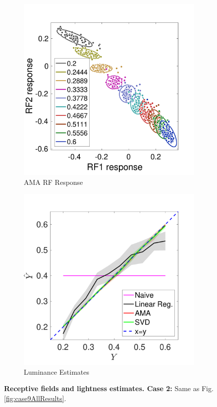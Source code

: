 \documentclass{jov}
\begin{document}
\begin{figure}
\begin{subfigure}[b]{0.20 \textwidth}
        \includegraphics[width=\textwidth]{Figure6/case10FiltersResponse.pdf}
        \caption{AMA RF Response}
        \label{fig:case10FiltersResponse}
    \end{subfigure}    
        \begin{subfigure}[b]{0.2 \textwidth}
        \includegraphics[width=\textwidth]{Figure6/case10Results.pdf}
        \caption{Luminance Estimates}
        \label{fig:case10Results}
    \end{subfigure}
    \label{fig:case10AllResults}
    \caption{{\bf Receptive fields and lightness estimates. Case 2:} Same as Fig. \ref{fig:case9AllResults}.}
\end{figure}
\end{document}
